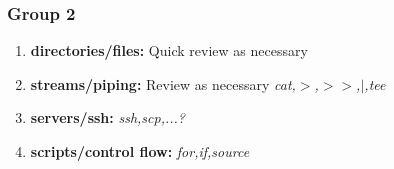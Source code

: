 \documentclass{beamer}
\begin{document}
\begin{frame}
\frametitle{Group 2}
\begin{enumerate}
\item \textbf{directories/files:} Quick review as necessary
\item \textbf{streams/piping:} Review as necessary \textit{cat,$>$,$>>$,$|$,tee}
\item \textbf{servers/ssh:} \textit{ssh,scp,...?}
\item \textbf{scripts/control flow:} \textit{for,if,source}
\end{enumerate}
\end{frame}
\end{document}
